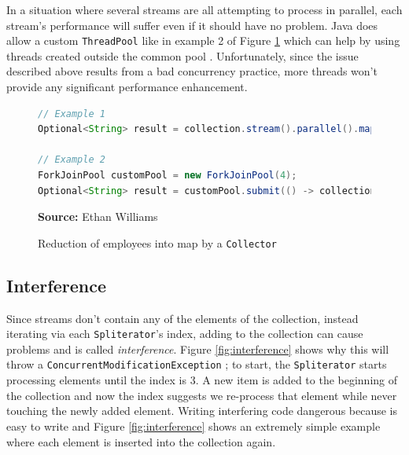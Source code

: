 \documentclass[oneside, 12pt]{article}
\newcommand{\source}[1]{\textbf{Source:} {#1} }
\begin{document}
In a situation where several streams are all attempting to process in parallel, each stream's performance will suffer even if it should have no problem. Java does allow a custom \verb|ThreadPool| like in example 2 of Figure \ref{fig:network_op} which can help by using threads created outside the common pool \autocite{dzone_fjp}. Unfortunately, since the issue described above results from a bad concurrency practice, more threads won't provide any significant performance enhancement.

\begin{figure}[H]
\centering
\begin{lstlisting}[language=Java]
// Example 1
Optional<String> result = collection.stream().parallel().map((base) -> longOperation(argument)).findAny();

// Example 2
ForkJoinPool customPool = new ForkJoinPool(4);
Optional<String> result = customPool.submit(() -> collection.stream().parallel().map((arg) -> longOperation(arg)).findAny()).get();
\end{lstlisting}
\caption{Reduction of employees into map by a {\tt Collector}}
\source{Ethan Williams}
\label{fig:network_op}
\end{figure}

\subsection{Interference}
Since streams don't contain any of the elements of the collection, instead iterating via each \verb|Spliterator|'s index, adding to the collection can cause problems and is called \textit{interference}. Figure \ref{fig:interference} shows why this will throw a \verb|ConcurrentModificationException| \autocite{parallelism_doc}; to start, the \verb|Spliterator| starts processing elements until the index is 3. A new item is added to the beginning of the collection and now the index suggests we re-process that element while never touching the newly added element. Writing interfering code dangerous because is easy to write and Figure \ref{fig:interference} shows an extremely simple example where each element is inserted into the collection again.
\end{document}
